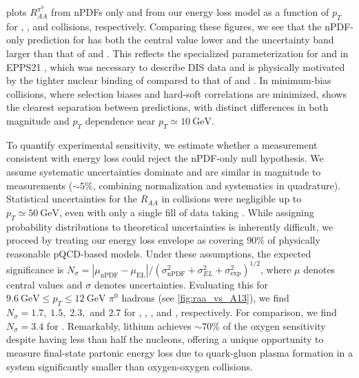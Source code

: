 \documentclass[%
 reprint,
 amsmath,amssymb,
 aps,
 prl,nofootinbib,
 superscriptaddress
]{revtex4-2}
\begin{document}
  plots $R^{\pi^0}_{AA}$ from nPDFs only and from our energy loss model as a function of $p_T$ for , , and \lili{} collisions, respectively.
Comparing these figures, we see that the nPDF-only prediction for  has both the central value lower and the uncertainty band larger than that of  and \lili. This reflects the specialized parameterization for  and \li{} in EPPS21 \cite{Eskola:2021nhw}, which was necessary to describe DIS data and is physically motivated by the tighter nuclear binding of  compared to that of  and \li{} \cite{Wang:2012eof}. In minimum-bias collisions, where selection biases and hard-soft correlations are minimized, \lili{} shows the clearest separation between predictions, with distinct differences in both magnitude and $p_T$ dependence near $p_T \simeq 10 ~\mathrm{GeV}$.



To quantify experimental sensitivity, we estimate whether a measurement consistent with energy loss could reject the nPDF-only null hypothesis. 
We assume systematic uncertainties dominate and are similar in magnitude to \neon{} measurements ($\sim 5\%$, combining normalization and systematics in quadrature). Statistical uncertainties for the $R_{AA}$ in \nene{} collisions were negligible up to $p_T \simeq 50 ~\mathrm{GeV}$, even with only a single fill of data taking \cite{2969907}. 
While assigning probability distributions to theoretical uncertainties is inherently difficult, we proceed by treating our energy loss envelope as covering $90\%$ of physically reasonable pQCD-based models. %
Under these assumptions, the expected significance is $N_\sigma = | \mu_{\text{nPDF}} - \mu_{\text{EL}}|/(\sigma_{\text{nPDF}}^2 + \sigma_{EL}^2 + \sigma_{\text{exp}}^2)^{1 / 2}$, where $\mu$ denotes central values and $\sigma$ denotes uncertainties. Evaluating this for $9.6 ~\mathrm{GeV} \leq p_T \leq 12 ~\mathrm{GeV}$ $\pi^0$ hadrons (see \cref{fig:raa_vs_A13}), we find $N_{\sigma} = 1.7, \; 1.5, \; 2.3,$ and $2.7$ for , , \lili{}, and \btbt{}, respectively. For comparison, we find $N_{\sigma} = 3.4$ for \oo. 
Remarkably, lithium achieves $\sim 70\%$ of the oxygen sensitivity despite having less than half the nucleons, offering a unique opportunity to measure final-state partonic energy loss due to quark-gluon plasma formation in a system significantly smaller than oxygen-oxygen collisions.
\end{document}
